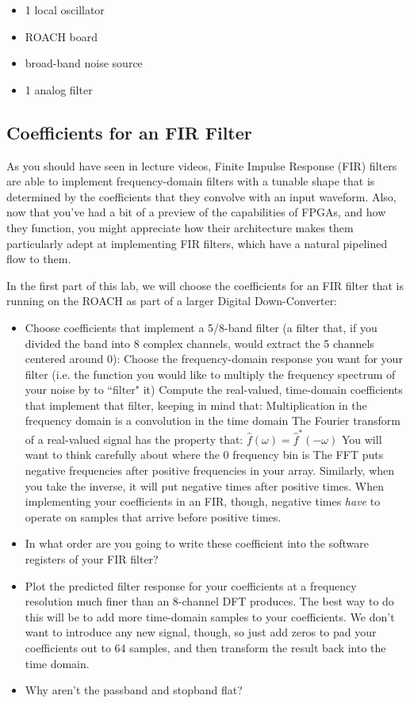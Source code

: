 \documentclass[11pt]{article}
\begin{document}
\begin{itemize}[noitemsep,nolistsep]
\item 1 local oscillator
\item ROACH board
\item broad-band noise source
\item 1 analog filter
\end{itemize}

\subsection{Coefficients for an FIR Filter} \label{fir_filter}

As you should have seen in lecture videos, Finite Impulse Response (FIR) filters are
able to implement frequency-domain filters with a tunable shape that is determined
by the coefficients that they convolve with an input waveform.
Also, now that you've had a bit of a preview of the capabilities of FPGAs, and how they function,
you might appreciate how their architecture makes them particularly adept at implementing
FIR filters, which have a natural pipelined flow to them.

In the first part of this lab, we will choose the coefficients for an FIR filter that is running
on the ROACH as part of a larger Digital Down-Converter:
\begin{itemize}[noitemsep,nolistsep]
\item Choose coefficients that implement a 5/8-band filter (a filter that, if you divided the band into 8 complex
channels, would extract the 5 channels centered around 0):
\subitem Choose the frequency-domain response you want for your filter (i.e. the function you would like to multiply
the frequency spectrum of your noise by to ``filter" it)
\subitem Compute the real-valued, time-domain coefficients that implement that filter, keeping in mind that: 
\subsubitem Multiplication in the frequency domain is a convolution in the time domain
\subsubitem The Fourier transform of a real-valued signal has the property that:
$\hat f(\omega) = \hat f^*(-\omega)$
\subsubitem You will want to think carefully about where the 0 frequency bin is
\subsubitem The FFT puts negative frequencies after positive frequencies in your array.  Similarly, when you take the inverse, it will put negative times after positive times.  When implementing your coefficients in an FIR, though, negative times {\it have} to operate on samples that arrive before positive times.
\item In what order are you going to write these coefficient into the software registers of your FIR filter?
\item Plot the predicted filter response for your coefficients at a frequency resolution much finer than an 8-channel
DFT produces.  The best way to do this will be to add more time-domain samples to your coefficients.  We don't want to introduce any new signal, though, so just add zeros to pad your coefficients out to 64 samples, and then transform the result back into the time domain.  
\item Why aren't the passband and stopband flat?
\end{itemize}
\end{document}
